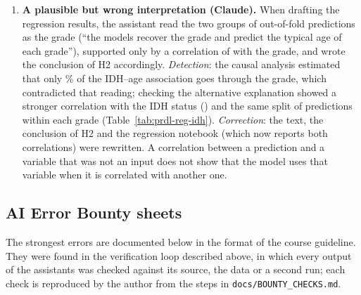 \begin{enumerate}
        that asked for the exact quote: an extracted statement that one study had not tuned its
        models inside the cross-validation was supported only by a quote on feature selection, and the
        targeted query showed that the classifiers used default hyperparameters \cite{tasci2022}; a
        count of reclassified cases, presented as a change from the original TCGA labels, compared
        two re-annotation pipelines instead \cite{leiriademendonca2025}.
  \item \textbf{A plausible but wrong interpretation (Claude).} When drafting the regression results,
        the assistant read the two groups of out-of-fold predictions as the grade (``the models recover
        the grade and predict the typical age of each grade''), supported only by a correlation of
        \RegCorrGrade{} with the grade, and wrote the conclusion of H2 accordingly. \emph{Detection}: the
        causal analysis estimated that only \CsPropPct\% of the IDH--age association goes through the
        grade, which contradicted that reading; checking the alternative explanation showed a stronger
        correlation with the IDH status (\RegCorrIDH) and the same split of predictions within each
        grade (Table~\ref{tab:prdl-reg-idh}). \emph{Correction}: the text, the conclusion of H2 and the
        regression notebook (which now reports both correlations) were rewritten. A correlation between
        a prediction and a variable that was not an input does not show that the model uses that
        variable when it is correlated with another one.
\end{enumerate}

\subsection*{AI Error Bounty sheets}

The strongest errors are documented below in the format of the course guideline. They were found in
the verification loop described above, in which every output of the assistants was checked against its
source, the data or a second run; each check is reproduced by the author from the steps in
\texttt{docs/\allowbreak{}BOUNTY\_\allowbreak{}CHECKS.\allowbreak{}md}.

